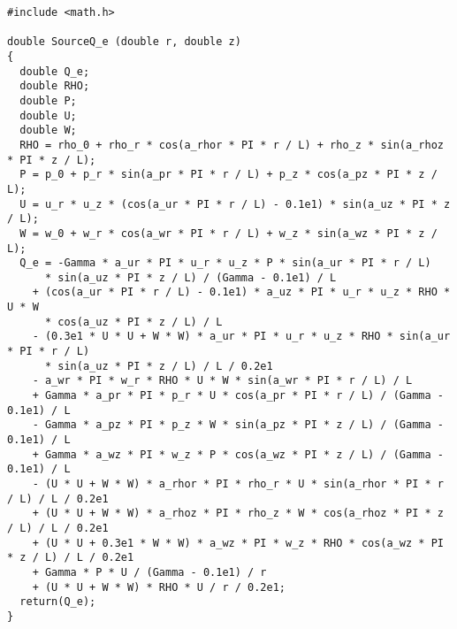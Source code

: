 \documentclass[10pt]{article}
\begin{document}
\begin{small}
\begin{verbatim}
#include <math.h>

double SourceQ_e (double r, double z)
{
  double Q_e;
  double RHO;
  double P;
  double U;
  double W;
  RHO = rho_0 + rho_r * cos(a_rhor * PI * r / L) + rho_z * sin(a_rhoz * PI * z / L);
  P = p_0 + p_r * sin(a_pr * PI * r / L) + p_z * cos(a_pz * PI * z / L);
  U = u_r * u_z * (cos(a_ur * PI * r / L) - 0.1e1) * sin(a_uz * PI * z / L);
  W = w_0 + w_r * cos(a_wr * PI * r / L) + w_z * sin(a_wz * PI * z / L);
  Q_e = -Gamma * a_ur * PI * u_r * u_z * P * sin(a_ur * PI * r / L)
      * sin(a_uz * PI * z / L) / (Gamma - 0.1e1) / L
    + (cos(a_ur * PI * r / L) - 0.1e1) * a_uz * PI * u_r * u_z * RHO * U * W
      * cos(a_uz * PI * z / L) / L
    - (0.3e1 * U * U + W * W) * a_ur * PI * u_r * u_z * RHO * sin(a_ur * PI * r / L)
      * sin(a_uz * PI * z / L) / L / 0.2e1
    - a_wr * PI * w_r * RHO * U * W * sin(a_wr * PI * r / L) / L
    + Gamma * a_pr * PI * p_r * U * cos(a_pr * PI * r / L) / (Gamma - 0.1e1) / L
    - Gamma * a_pz * PI * p_z * W * sin(a_pz * PI * z / L) / (Gamma - 0.1e1) / L
    + Gamma * a_wz * PI * w_z * P * cos(a_wz * PI * z / L) / (Gamma - 0.1e1) / L
    - (U * U + W * W) * a_rhor * PI * rho_r * U * sin(a_rhor * PI * r / L) / L / 0.2e1
    + (U * U + W * W) * a_rhoz * PI * rho_z * W * cos(a_rhoz * PI * z / L) / L / 0.2e1
    + (U * U + 0.3e1 * W * W) * a_wz * PI * w_z * RHO * cos(a_wz * PI * z / L) / L / 0.2e1
    + Gamma * P * U / (Gamma - 0.1e1) / r
    + (U * U + W * W) * RHO * U / r / 0.2e1;
  return(Q_e);
} 
\end{verbatim}
\end{small}





\end{document}
